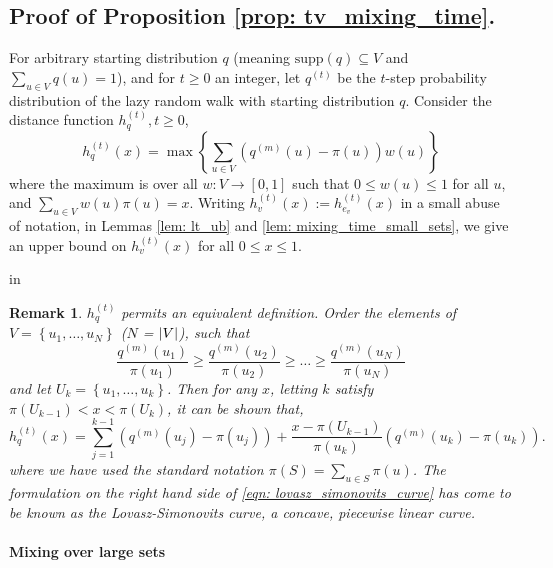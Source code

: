 \documentclass[11pt,twoside]{article}
\newtheorem*{remark}{Remark}
\DeclarePairedDelimiter\abs{\lvert}{\rvert}
\newcommand{\set}[1]{\left\{#1\right\}}
\newcommand{\1}{\mathbf{1}}
\begin{document}
\subsection{Proof of Proposition \ref{prop: tv_mixing_time}.}
\label{sec: proof_of_proposition_tv_mixing_time}

For arbitrary starting distribution $q$ (meaning $\textrm{supp}(q) \subseteq V$ and $\sum_{u \in V}q(u) = 1$), and for $t \geq 0$ an integer, let $q^{(t)}$ be the $t$-step probability distribution of the lazy random walk with starting distribution $q$. Consider the distance function $h_q^{(t)}, t \geq 0$, 
\begin{equation*}
h_q^{(t)}(x) = \max \left\{ \sum_{u \in V} \left(q^{(m)}(u) - \pi(u)\right)w(u)\right\}
\end{equation*}
where the maximum is over all $w: V \to [0,1]$ such that $0 \leq w(u) \leq 1$ for all $u$, and $\sum_{u \in V} w(u) \pi(u) = x$. Writing $h_v^{(t)}(x) := h_{e_v}^{(t)}(x)$ in a small abuse of notation, in Lemmas \ref{lem: lt_ub} and \ref{lem: mixing_time_small_sets}, we give an upper bound on $h_{v}^{(t)}(x)$ for all $0 \leq x \leq 1$. 

 in
\begin{remark}
	$h_q^{(t)}$ permits an equivalent definition. Order the elements of $V = \set{u_1, \ldots, u_N}$ ($N$ = $\abs{V}$), such that
	\begin{equation*}
	\frac{q^{(m)}(u_1)}{\pi(u_1)} \geq \frac{q^{(m)}(u_2)}{\pi(u_2)} \geq \ldots \geq \frac{q^{(m)}(u_N)}{\pi(u_N)}
	\end{equation*}
	and let $U_k = \set{u_1, \ldots, u_k}$. Then for any $x$, letting $k$ satisfy $\pi(U_{k - 1}) < x < \pi(U_k)$, it can be shown that,
	\begin{equation}
	\label{eqn: lovasz_simonovits_curve}
	h_q^{(t)}(x) = \sum_{j = 1}^{k - 1} (q^{(m)}(u_j) - \pi(u_j)) + \frac{x - \pi(U_{k - 1})}{\pi(u_k)} \left(q^{(m)}(u_k) - \pi(u_k) \right).
	\end{equation}
	where we have used the standard notation $\pi(S) = \sum_{u \in S} \pi(u)$. 
	The formulation on the right hand side of \eqref{eqn: lovasz_simonovits_curve} has come to be known as the \emph{Lovasz-Simonovits curve}, a concave, piecewise linear curve.
\end{remark}

\paragraph{Mixing over large sets}
\end{document}
